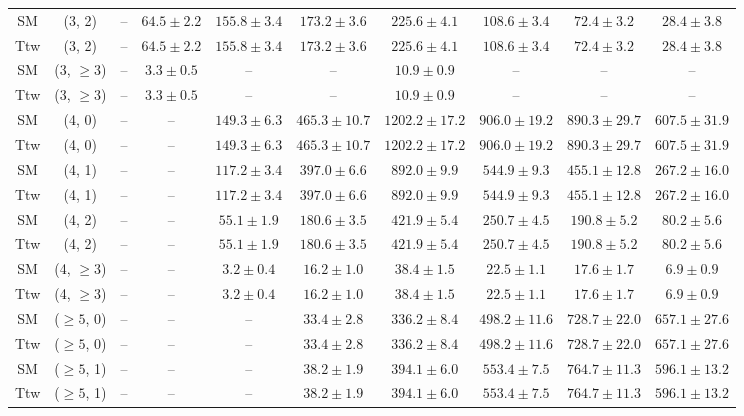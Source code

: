 \begin{table}[h!]
{\begin{tabular}{cccccccccc}
	SM & (3, 2) & -- & $64.5\pm 2.2$ & $155.8\pm 3.4$ & $173.2\pm 3.6$ & $225.6\pm 4.1$ & $108.6\pm 3.4$ & $72.4\pm 3.2$ & $28.4\pm 3.8$ \\[0.5ex] 
	Ttw & (3, 2) & -- & $64.5\pm 2.2$ & $155.8\pm 3.4$ & $173.2\pm 3.6$ & $225.6\pm 4.1$ & $108.6\pm 3.4$ & $72.4\pm 3.2$ & $28.4\pm 3.8$ \\[0.5ex] 
	SM & (3, $\ge3$) & -- & $3.3\pm 0.5$ & -- & -- & $10.9\pm 0.9$ & -- & -- & -- \\[0.5ex] 
	Ttw & (3, $\ge3$) & -- & $3.3\pm 0.5$ & -- & -- & $10.9\pm 0.9$ & -- & -- & -- \\[0.5ex] 
	SM & (4, 0) & -- & -- & $149.3\pm 6.3$ & $465.3\pm 10.7$ & $1202.2\pm 17.2$ & $906.0\pm 19.2$ & $890.3\pm 29.7$ & $607.5\pm 31.9$ \\[0.5ex] 
	Ttw & (4, 0) & -- & -- & $149.3\pm 6.3$ & $465.3\pm 10.7$ & $1202.2\pm 17.2$ & $906.0\pm 19.2$ & $890.3\pm 29.7$ & $607.5\pm 31.9$ \\[0.5ex] 
	SM & (4, 1) & -- & -- & $117.2\pm 3.4$ & $397.0\pm 6.6$ & $892.0\pm 9.9$ & $544.9\pm 9.3$ & $455.1\pm 12.8$ & $267.2\pm 16.0$ \\[0.5ex] 
	Ttw & (4, 1) & -- & -- & $117.2\pm 3.4$ & $397.0\pm 6.6$ & $892.0\pm 9.9$ & $544.9\pm 9.3$ & $455.1\pm 12.8$ & $267.2\pm 16.0$ \\[0.5ex] 
	SM & (4, 2) & -- & -- & $55.1\pm 1.9$ & $180.6\pm 3.5$ & $421.9\pm 5.4$ & $250.7\pm 4.5$ & $190.8\pm 5.2$ & $80.2\pm 5.6$ \\[0.5ex] 
	Ttw & (4, 2) & -- & -- & $55.1\pm 1.9$ & $180.6\pm 3.5$ & $421.9\pm 5.4$ & $250.7\pm 4.5$ & $190.8\pm 5.2$ & $80.2\pm 5.6$ \\[0.5ex] 
	SM & (4, $\ge3$) & -- & -- & $3.2\pm 0.4$ & $16.2\pm 1.0$ & $38.4\pm 1.5$ & $22.5\pm 1.1$ & $17.6\pm 1.7$ & $6.9\pm 0.9$ \\[0.5ex] 
	Ttw & (4, $\ge3$) & -- & -- & $3.2\pm 0.4$ & $16.2\pm 1.0$ & $38.4\pm 1.5$ & $22.5\pm 1.1$ & $17.6\pm 1.7$ & $6.9\pm 0.9$ \\[0.5ex] 
	SM & ($\ge5$, 0) & -- & -- & -- & $33.4\pm 2.8$ & $336.2\pm 8.4$ & $498.2\pm 11.6$ & $728.7\pm 22.0$ & $657.1\pm 27.6$ \\[0.5ex] 
	Ttw & ($\ge5$, 0) & -- & -- & -- & $33.4\pm 2.8$ & $336.2\pm 8.4$ & $498.2\pm 11.6$ & $728.7\pm 22.0$ & $657.1\pm 27.6$ \\[0.5ex] 
	SM & ($\ge5$, 1) & -- & -- & -- & $38.2\pm 1.9$ & $394.1\pm 6.0$ & $553.4\pm 7.5$ & $764.7\pm 11.3$ & $596.1\pm 13.2$ \\[0.5ex] 
	Ttw & ($\ge5$, 1) & -- & -- & -- & $38.2\pm 1.9$ & $394.1\pm 6.0$ & $553.4\pm 7.5$ & $764.7\pm 11.3$ & $596.1\pm 13.2$ \\[0.5ex] 

\end{tabular}}
\end{table}
